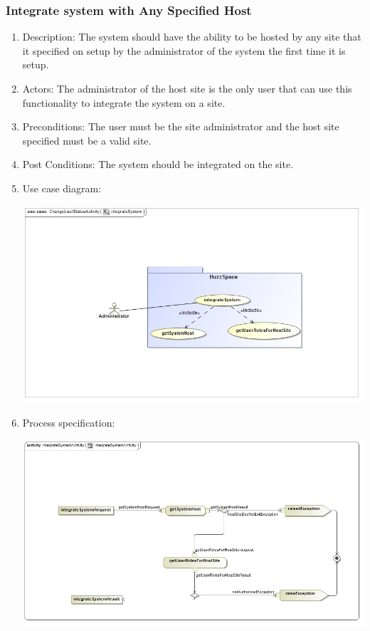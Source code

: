\documentclass[hidelinks, 12pt, oneside]{article}
\begin{document}
\subsubsection{Integrate system with Any Specified Host}
\begin{enumerate}
\item Description: The system should have the ability to be hosted by any site that it specified on setup by the administrator of the system the first time it is setup.
\item Actors: The administrator of the host site is the only user that can use this functionality to integrate the system on a site.
\item Preconditions: The user must be the site administrator and the host site specified must be a valid site.
\item Post Conditions: The system should be integrated on the site.

\item Use case diagram:\\
\centerline{\includegraphics[scale=0.5]{integrateSystem.jpg}}
 \item Process specification:\\ 
\centerline{\includegraphics[scale=0.5]{integrateSystemActivity.jpg}}

\end{enumerate}
\end{document}
